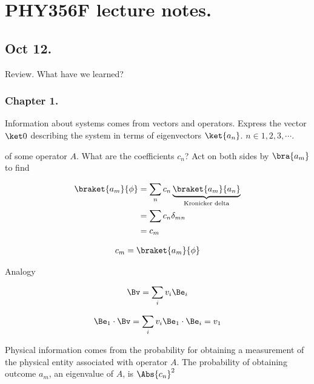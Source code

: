 
%

\chapter{PHY356F lecture notes.}
\label{chap:PHY356F}
{}

\beginArtNoToc

\section{Oct 12.}

Review.  What have we learned?

\subsection{Chapter 1.}
Information about systems comes from vectors and operators.  Express the vector $\ket0$ describing the system in terms of eigenvectors $\ket{a_n}$.  $n \in 1,2,3,\cdots$.

of some operator $A$.  What are the coefficients $c_n$?  Act on both sides by $\bra{a_m}$ to find

\begin{align*}
\braket{a_m}{\phi} 
&= \sum_n c_n \underbrace{\braket{a_m}{a_n}}_{\text{Kronicker delta}}  \\
&= \sum c_n \delta_{mn} \\
&= c_m
\end{align*}

\begin{align*}
c_m = \braket{a_m}{\phi}
\end{align*}

Analogy

\begin{align*}
\Bv = \sum_i v_i \Be_i 
\end{align*}

\begin{align*}
\Be_1 \cdot \Bv = \sum_i v_i \Be_1 \cdot \Be_i = v_1
\end{align*}

Physical information comes from the probability for obtaining a measurement of the physical entity associated with operator $A$.  The probability of obtaining outcome $a_m$, an eigenvalue of $A$, is $\Abs{c_n}^2$

